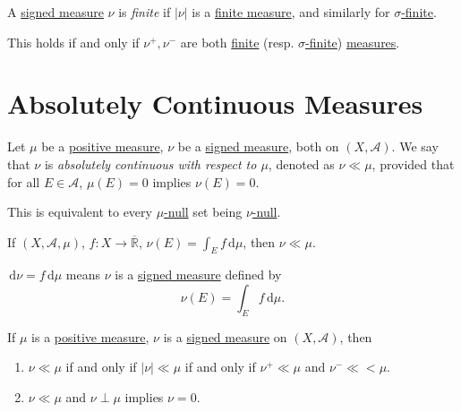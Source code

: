 \begin{definition}\label{def:finite-signed-measure}
	A \hyperref[def:signed-measure]{signed measure} \(\nu\) is \emph{finite} if \(\left\vert \nu \right\vert\) is a \hyperref[def:finite-measure]{finite measure},
	and similarly for \hyperref[def:finite-measure]{\(\sigma\)-finite}.
\end{definition}
\begin{remark}
	This holds if and only if \(\nu^+,\nu^-\) are both \hyperref[def:finite-measure]{finite} (resp. \hyperref[def:finite-measure]{\(\sigma\)-finite})
	\hyperref[def:measure]{measures}.
\end{remark}

\section{Absolutely Continuous Measures}
\begin{definition}\label{def:absolutely-continuous}
	Let \(\mu\) be a \hyperref[def:signed-measure]{positive measure}, \(\nu\) be a \hyperref[def:signed-measure]{signed measure}, both on \((X, \mathcal{A})\). We say that \(\nu\) is
	\emph{absolutely continuous with respect to \(\mu\)}, denoted as \(\nu \ll \mu\), provided that for all \(E \in \mathcal{A}\), \(\mu(E) = 0\) implies \(\nu(E) = 0\).
\end{definition}
\begin{remark}
	This is equivalent to every \hyperref[def:null-set-for-a-signed-measure]{\(\mu\)-null} set being \hyperref[def:null-set-for-a-signed-measure]{\(\nu\)-null}.
\end{remark}
\begin{eg}
	If \((X ,\mathcal{A}, \mu)\), \(f \colon X \to \overline{\mathbb{R}}\), \(\nu(E) = \int_E f \,\mathrm{d} \mu\), then \(\nu \ll \mu\).
\end{eg}

\begin{notation}
	\(\,\mathrm{d} \nu = f \,\mathrm{d} \mu\) means \(\nu\) is a \hyperref[def:signed-measure]{signed measure} defined by
	\[
		\nu(E) = \int_E f \,\mathrm{d} \mu.
	\]
\end{notation}

\begin{lemma}
	If \(\mu\) is a \hyperref[def:signed-measure]{positive measure}, \(\nu\) is a \hyperref[def:signed-measure]{signed measure} on \((X, \mathcal{A})\), then
	\begin{enumerate}
		\item \(\nu \ll \mu\) if and only if \(\left\vert \nu \right\vert \ll \mu\) if and only if \(\nu^+ \ll \mu\) and \(\nu^- \ll< \mu\).
		\item \(\nu \ll \mu\) and \(\nu \perp \mu\) implies \(\nu = 0\).
	\end{enumerate}
\end{lemma}

